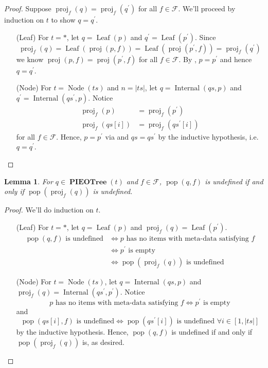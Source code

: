 \documentclass{amsart}
\DeclareMathOperator{\pop}{\mathrm{pop}}
\DeclareMathOperator{\proj}{\mathrm{proj}}
\DeclareMathOperator{\PIEOTree}{\mathbf{PIEOTree}}
\DeclareMathOperator{\Leaf}{\mathrm{Leaf}}
\DeclareMathOperator{\Internal}{\mathrm{Internal}}
\DeclareMathOperator{\Node}{\mathrm{Node}}
\newtheorem{lem}[thm]{Lemma}
\theoremstyle{definition}
\begin{document}
\begin{proof}
    Suppose $\proj_f(q) = \proj_f(q^\prime)$ for all $f \in \mathcal F$.
    We'll proceed by induction on $t$ to show $q = q^\prime$.
    \begin{itemize}
        \item[(Leaf)] For $t = \ast$, let $q = \Leaf(p)$ and $q^\prime = \Leaf(p^\prime)$.
            Since $$\proj_f(q) = \Leaf(\proj(p, f)) = \Leaf(\proj(p^\prime, f)) = \proj_f(q^\prime)$$
            we know $\proj(p, f) = \proj(p^\prime, f)$ for all $f \in \mathcal F$.
            By , $p = p^\prime$ and hence $q = q^\prime$.
        \item[(Node)] For $t = \Node(ts)$ and $n = |ts|$, let $q = \Internal(qs, p)$ and $q^\prime = \Internal(qs^\prime, p)$.
            Notice
            \begin{align*}
                \proj_f(p) &= \proj_f(p^\prime)\\
                \proj_f(qs[i]) &= \proj_f(qs^\prime[i]) \tag{$i = 1,\ldots, n$}
            \end{align*}
            for all $f \in \mathcal F$. 
            Hence, $p = p^\prime$ via  and $qs = qs^\prime$ by the inductive hypothesis, i.e. $q = q^\prime$.
    \end{itemize}
\end{proof}

\begin{lem}
    \label{lem:pop_undef}
    For $q \in \PIEOTree(t)$ and $f \in \mathcal F$, $\pop(q, f)$ is undefined if and only if $\pop(\proj_f(q))$ is undefined.
\end{lem}

\begin{proof}
    We'll do induction on $t$.
    \begin{itemize}
        \item[(Leaf)] For $t = \ast$, let $q = \Leaf(p)$ and $\proj_f(q) = \Leaf(p^\prime)$.
            \begin{align*}
                \pop(q, f) \text{ is undefined} &\iff \text{$p$ has no items with meta-data satisfying $f$}\\
                                                &\iff p^\prime \text{ is empty}\\
                                                &\iff \pop(\proj_f(q)) \text{ is undefined}
            \end{align*}

        \item[(Node)] For $t = \Node(ts)$, let $q = \Internal(qs, p)$ and $\proj_f(q) = \Internal(qs^\prime, p^\prime)$.
            Notice 
            $$\text{$p$ has no items with meta-data satisfying $f$} \iff p^\prime \text{ is empty}$$
            and 
            $$\pop(qs[i], f) \text{ is undefined} \iff \pop(qs^\prime[i]) \text{ is undefined $\forall i \in [1, |ts|]$}$$
            by the inductive hypothesis.
            Hence, $\pop(q, f)$ is undefined if and only if $\pop(\proj_f(q))$ is, as desired.
    \end{itemize}
\end{proof}
\end{document}
